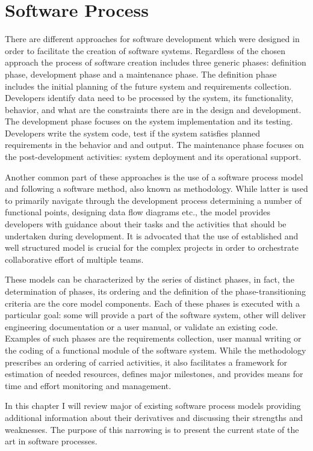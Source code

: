 \chapter{Software Process}
There are different approaches for software development which were designed in order to 
facilitate the creation of software systems. Regardless of the chosen approach the 
process of software creation includes three generic phases: definition phase, 
development phase and a maintenance phase. The definition phase includes the initial
planning of the future system and requirements collection. Developers identify data 
need to be processed by the system, its functionality, behavior, and what are 
the constraints there are in the design and development. The development phase focuses 
on the system implementation and its testing. Developers write the system code, 
test if the system satisfies planned requirements in the behavior and and output. 
The maintenance phase focuses on the post-development activities: system deployment 
and its operational support. 

Another common part of these approaches is the use 
of a software process model and following a software method, also known as methodology.
While latter is used to primarily navigate through the development process determining
a number of functional points, designing data flow diagrams etc., the model provides 
developers with guidance about their tasks and the activities that should be undertaken 
during development. It is advocated that the use of established and well structured 
model is crucial for the complex projects in order to orchestrate collaborative effort 
of multiple teams. 

These models can be characterized by the series of distinct phases, in fact, the 
determination of phases, its ordering and the definition of the phase-transitioning 
criteria are the core model components.
Each of these phases is executed with a particular goal: some will provide a part of the 
software system, other will deliver engineering documentation or a user manual, or 
validate an existing code. Examples of such phases are the requirements collection, 
user manual writing or the coding of a functional module of the software system. 
While the methodology prescribes an ordering of carried activities, it also facilitates
a framework for estimation of needed resources, defines major milestones, and provides 
means for time and effort monitoring and management. 

In this chapter I will review major of existing software process models providing additional 
information about their derivatives and discussing their strengths and weaknesses.
The purpose of this narrowing is to present the current state of the art in software 
processes.

